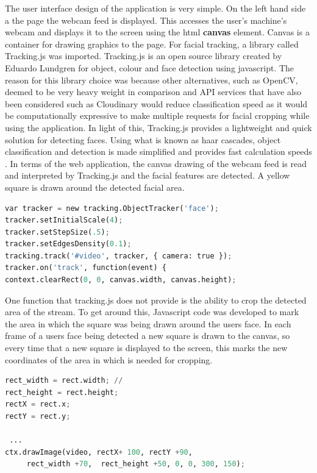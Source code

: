 The user interface design of the application is very simple. On the left hand side a the page the webcam feed is displayed. This accesses the user's machine's webcam and displays it to the screen using the html \textbf{canvas} element. Canvas is a container for drawing graphics to the page. For facial tracking, a library called Tracking.js was imported. Tracking.js is an open source library created by Eduardo Lundgren for object, colour and face detection using javascript. The reason for this library choice was because other alternatives, such as OpenCV, deemed to be very heavy weight in comparison and API services that have also been considered such as Cloudinary would reduce classification speed as it would be computationally expressive to make multiple requests for facial cropping while using the application. 
In light of this, Tracking.js provides a lightweight and quick solution for detecting faces. Using what is known as haar cascades, object classification and detection is made simplified and provides fast calculation speeds \citep{viola}. In terms of the web application, the canvas drawing of the webcam feed is read and interpreted by Tracking.js and the facial features are detected. A yellow square is drawn around the detected facial area.

\begin{lstlisting}[language=python, frame=single]
var tracker = new tracking.ObjectTracker('face');
tracker.setInitialScale(4);
tracker.setStepSize(.5);
tracker.setEdgesDensity(0.1);
tracking.track('#video', tracker, { camera: true });
tracker.on('track', function(event) {
context.clearRect(0, 0, canvas.width, canvas.height);
\end{lstlisting}

One function that tracking.js does not provide is the ability to crop the detected area of the stream. To get around this, Javascript code was developed to mark the area in which the square was being drawn around the users face. In each frame of a users face being detected a new square is drawn to the canvas, so every time that a new square is displayed to the screen, this marks the new coordinates of the area in which is needed for cropping. 

\begin{lstlisting}[language=python, frame=single]
rect_width = rect.width; // 
rect_height = rect.height;
rectX = rect.x;
rectY = rect.y;

 ...
ctx.drawImage(video, rectX+ 100, rectY +90,
	 rect_width +70,  rect_height +50, 0, 0, 300, 150);
\end{lstlisting}

